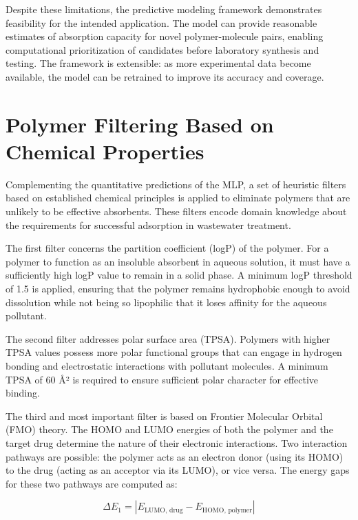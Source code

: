 Despite these limitations, the predictive modeling framework demonstrates feasibility for the intended application. The model can provide reasonable estimates of absorption capacity for novel polymer-molecule pairs, enabling computational prioritization of candidates before laboratory synthesis and testing. The framework is extensible: as more experimental data become available, the model can be retrained to improve its accuracy and coverage.

\section{Polymer Filtering Based on Chemical Properties}
\label{sec:polymer_filtering}

Complementing the quantitative predictions of the MLP, a set of heuristic filters based on established chemical principles is applied to eliminate polymers that are unlikely to be effective absorbents. These filters encode domain knowledge about the requirements for successful adsorption in wastewater treatment.

The first filter concerns the partition coefficient (logP) of the polymer. For a polymer to function as an insoluble absorbent in aqueous solution, it must have a sufficiently high logP value to remain in a solid phase. A minimum logP threshold of 1.5 is applied, ensuring that the polymer remains hydrophobic enough to avoid dissolution while not being so lipophilic that it loses affinity for the aqueous pollutant.

The second filter addresses polar surface area (TPSA). Polymers with higher TPSA values possess more polar functional groups that can engage in hydrogen bonding and electrostatic interactions with pollutant molecules. A minimum TPSA of 60 \r{A}² is required to ensure sufficient polar character for effective binding.

The third and most important filter is based on Frontier Molecular Orbital (FMO) theory. The HOMO and LUMO energies of both the polymer and the target drug determine the nature of their electronic interactions. Two interaction pathways are possible: the polymer acts as an electron donor (using its HOMO) to the drug (acting as an acceptor via its LUMO), or vice versa. The energy gaps for these two pathways are computed as:

\begin{equation}
	\Delta E_1 = |E_{\text{LUMO, drug}} - E_{\text{HOMO, polymer}}|
\end{equation}

